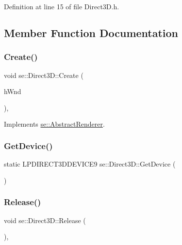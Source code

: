 Definition at line 15 of file Direct3\+D.\+h.



\subsection{Member Function Documentation}
\mbox{\label{classse_1_1_direct3_d_a316456762829db0614077cccd655e654}} 
\subsubsection{\texorpdfstring{Create()}{Create()}}
{\footnotesize\ttfamily void se\+::\+Direct3\+D\+::\+Create (\begin{DoxyParamCaption}\item[{H\+W\+ND}]{h\+Wnd }\end{DoxyParamCaption})\hspace{0.3cm}{\ttfamily [override]}, {\ttfamily [virtual]}}



Implements \mbox{\hyperlink{classse_1_1_abstract_renderer_afdfce8b91028448c17ce27550827f192}{se\+::\+Abstract\+Renderer}}.

\mbox{\label{classse_1_1_direct3_d_af37600089f9754a90e615210a6bee4f7}} 
\subsubsection{\texorpdfstring{Get\+Device()}{GetDevice()}}
{\footnotesize\ttfamily static L\+P\+D\+I\+R\+E\+C\+T3\+D\+D\+E\+V\+I\+C\+E9 se\+::\+Direct3\+D\+::\+Get\+Device (\begin{DoxyParamCaption}{ }\end{DoxyParamCaption})\hspace{0.3cm}{\ttfamily [static]}}

\mbox{\label{classse_1_1_direct3_d_ae2979f16a5c35773cf2c243d8e6f90e4}} 
\subsubsection{\texorpdfstring{Release()}{Release()}}
{\footnotesize\ttfamily void se\+::\+Direct3\+D\+::\+Release (\begin{DoxyParamCaption}{ }\end{DoxyParamCaption})\hspace{0.3cm}{\ttfamily [override]}, {\ttfamily [virtual]}}



